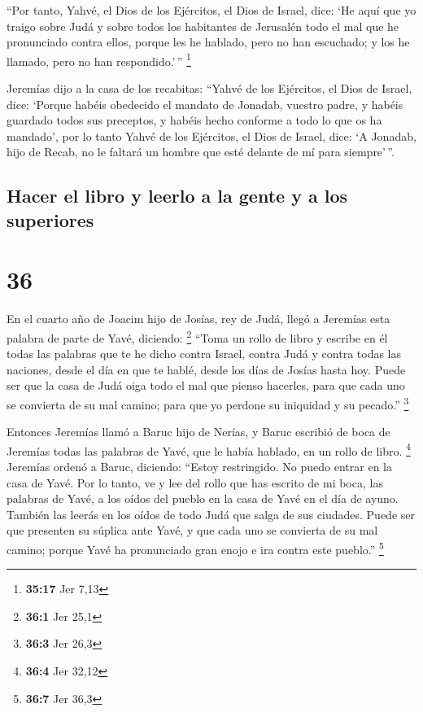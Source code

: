  ``Por tanto, Yahvé, el Dios de los Ejércitos, el Dios de
Israel, dice: `He aquí que yo traigo sobre Judá y sobre todos los
habitantes de Jerusalén todo el mal que he pronunciado contra ellos,
porque les he hablado, pero no han escuchado; y los he llamado, pero no
han respondido.'\,'' \footnote{\textbf{35:17} Jer 7,13}

 Jeremías dijo a la casa de los recabitas: ``Yahvé de los
Ejércitos, el Dios de Israel, dice: `Porque habéis obedecido el mandato
de Jonadab, vuestro padre, y habéis guardado todos sus preceptos, y
habéis hecho conforme a todo lo que os ha mandado',  por
lo tanto Yahvé de los Ejércitos, el Dios de Israel, dice: `A Jonadab,
hijo de Recab, no le faltará un hombre que esté delante de mí para
siempre'\,''.

\hypertarget{hacer-el-libro-y-leerlo-a-la-gente-y-a-los-superiores}{%
\subsection{Hacer el libro y leerlo a la gente y a los
superiores}\label{hacer-el-libro-y-leerlo-a-la-gente-y-a-los-superiores}}

\hypertarget{section-35}{%
\section{36}\label{section-35}}

 En el cuarto año de Joacim hijo de Josías, rey de Judá,
llegó a Jeremías esta palabra de parte de Yavé, diciendo: \footnote{\textbf{36:1}
  Jer 25,1}  ``Toma un rollo de libro y escribe en él
todas las palabras que te he dicho contra Israel, contra Judá y contra
todas las naciones, desde el día en que te hablé, desde los días de
Josías hasta hoy.  Puede ser que la casa de Judá oiga todo
el mal que pienso hacerles, para que cada uno se convierta de su mal
camino; para que yo perdone su iniquidad y su pecado.'' \footnote{\textbf{36:3}
  Jer 26,3}

 Entonces Jeremías llamó a Baruc hijo de Nerías, y Baruc
escribió de boca de Jeremías todas las palabras de Yavé, que le había
hablado, en un rollo de libro. \footnote{\textbf{36:4} Jer 32,12}
 Jeremías ordenó a Baruc, diciendo: ``Estoy restringido.
No puedo entrar en la casa de Yavé.  Por lo tanto, ve y
lee del rollo que has escrito de mi boca, las palabras de Yavé, a los
oídos del pueblo en la casa de Yavé en el día de ayuno. También las
leerás en los oídos de todo Judá que salga de sus ciudades.
 Puede ser que presenten su súplica ante Yavé, y que cada
uno se convierta de su mal camino; porque Yavé ha pronunciado gran enojo
e ira contra este pueblo.'' \footnote{\textbf{36:7} Jer 36,3}

